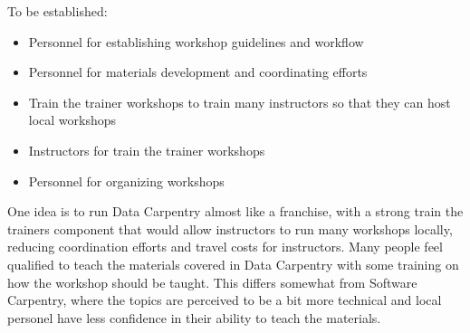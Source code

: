 \documentclass[11pt]{article}
\begin{document}
To be established:
\begin{itemize}
\item Personnel for establishing workshop guidelines and workflow
\item Personnel for materials development and coordinating efforts
\item Train the trainer workshops to train many instructors so that they can host local
workshops
\item Instructors for train the trainer workshops
\item Personnel for organizing workshops 
\end{itemize}

One idea is to run Data Carpentry almost like a franchise, with a strong train the 
trainers component that would allow instructors to run many workshops locally, 
reducing coordination efforts and travel costs for instructors. Many people feel 
qualified to teach the materials covered in Data Carpentry with some training on 
how the workshop should be taught. This differs somewhat from Software Carpentry, where
the topics are perceived to be a bit more technical and local personel have less 
confidence in their ability to teach the materials.
\end{document}
